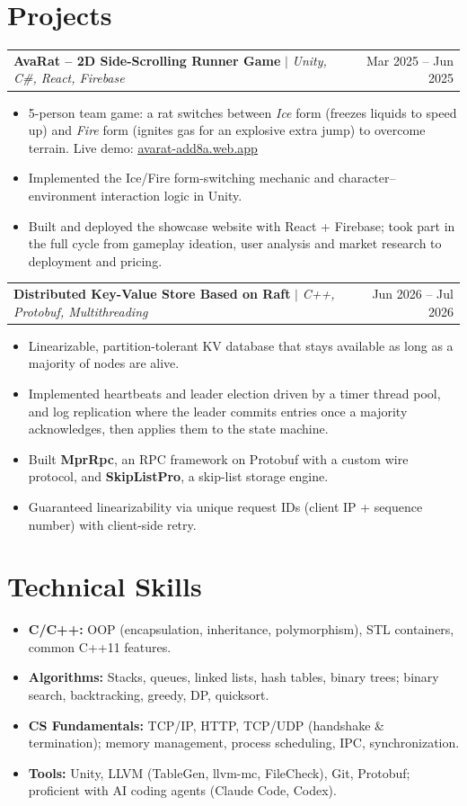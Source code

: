 \documentclass[11pt]{article}
\makeatletter
\newcommand{\project}[3]{%
  \begin{tabularx}{\linewidth}{@{}X r@{}}
    \textbf{#1} $|$ \small\textit{#2} & #3 \\
  \end{tabularx}\vspace{-2pt}%
}
\makeatother
\begin{document}
\section{Projects}
\project{AvaRat -- 2D Side-Scrolling Runner Game}{Unity, C\#, React, Firebase}{Mar 2025 -- Jun 2025}
\begin{itemize}
  \item 5-person team game: a rat switches between \textit{Ice} form (freezes liquids to speed up) and \textit{Fire} form (ignites gas for an explosive extra jump) to overcome terrain. Live demo: \href{https://avarat-add8a.web.app}{\underline{avarat-add8a.web.app}}
  \item Implemented the Ice/Fire form-switching mechanic and character--environment interaction logic in Unity.
  \item Built and deployed the showcase website with React + Firebase; took part in the full cycle from gameplay ideation, user analysis and market research to deployment and pricing.
\end{itemize}
\vspace{2pt}
\project{Distributed Key-Value Store Based on Raft}{C++, Protobuf, Multithreading}{Jun 2026 -- Jul 2026}
\begin{itemize}
  \item Linearizable, partition-tolerant KV database that stays available as long as a majority of nodes are alive.
  \item Implemented heartbeats and leader election driven by a timer thread pool, and log replication where the leader commits entries once a majority acknowledges, then applies them to the state machine.
  \item Built \textbf{MprRpc}, an RPC framework on Protobuf with a custom wire protocol, and \textbf{SkipListPro}, a skip-list storage engine.
  \item Guaranteed linearizability via unique request IDs (client IP + sequence number) with client-side retry.
\end{itemize}

\section{Technical Skills}
\begin{itemize}
  \item \textbf{C/C++:} OOP (encapsulation, inheritance, polymorphism), STL containers, common C++11 features.
  \item \textbf{Algorithms:} Stacks, queues, linked lists, hash tables, binary trees; binary search, backtracking, greedy, DP, quicksort.
  \item \textbf{CS Fundamentals:} TCP/IP, HTTP, TCP/UDP (handshake \& termination); memory management, process scheduling, IPC, synchronization.
  \item \textbf{Tools:} Unity, LLVM (TableGen, llvm-mc, FileCheck), Git, Protobuf; proficient with AI coding agents (Claude Code, Codex).
\end{itemize}
\end{document}

